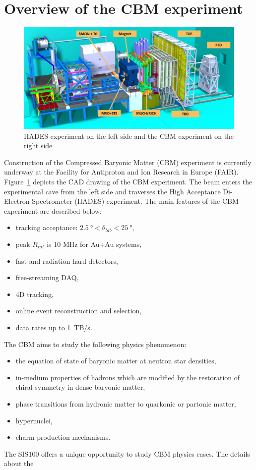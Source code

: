 \section{Overview of the CBM experiment}
\begin{figure}[!h]
    \centering
    \includegraphics[width=0.95\columnwidth]{Chapter1/images/CBMnew.png}
    \caption{HADES experiment on the left side and the \gls{CBM} experiment on the right side}
    \label{fig:exp}
\end{figure}

Construction of the Compressed Baryonic Matter (\gls{CBM}) experiment is currently underway at the Facility for Antiproton and Ion Research in Europe (\gls{FAIR}). Figure~\ref{fig:exp} depicts the CAD drawing of the \gls{CBM} experiment. The beam enters the experimental cave from the left side and traverses the High Acceptance Di-Electron Spectrometer (\gls{HADES}) experiment.  The main features of the \gls{CBM} experiment are described below:
\begin{itemize}
\item tracking acceptance: $\SI{2.5}{\degree} < \theta_{lab} < \SI{25}{\degree}$,
\item peak $R_{int}$ is 10 MHz for Au+Au systems,
\item fast and radiation hard detectors,
\item free-streaming \gls{DAQ},
\item 4D tracking,
\item online event reconstruction and selection,
\item data rates up to 1~TB/s.
\end{itemize}

The \gls{CBM} aims to study the following physics phenomenon:
\begin{itemize}
    \item the equation of state of baryonic matter at neutron star densities,
    \item in-medium properties of hadrons which are modified by the restoration of chiral symmetry in dense baryonic matter, 
    \item phase transitions from hydronic matter to quarkonic or partonic matter,
    \item hypernuclei,
    \item charm production mechanisms.
\end{itemize}
The SIS100 offers a unique opportunity to study \gls{CBM} physics cases. The details about the

